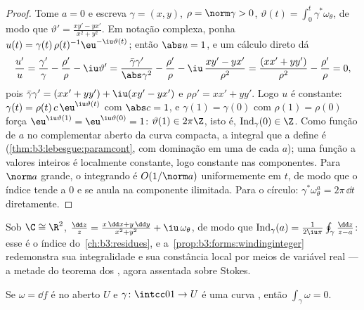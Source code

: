 \begin{proof}
Tome $a = 0$ e escreva $\gamma = (x, y)$, $\rho =
\norm\gamma > 0$, $\vartheta(t) =
\int_0^t\gamma^*\omega_\theta$, de modo que $\vartheta' =
\frac{xy' - yx'}{x^2 + y^2}$. Em
notação complexa, ponha $u(t)
= \gamma(t)\,\rho(t)^{-1}\eu^{-\iu\vartheta(t)}$; então $\abs u = 1$, e um cálculo direto dá
\[
\frac{u'}{u} = \frac{\gamma'}{\gamma} - \frac{\rho'}{\rho}
- \iu\vartheta'
= \frac{\bar\gamma\gamma'}{\abs\gamma^2} -
\frac{\rho'}{\rho} - \iu\,\frac{xy' -
yx'}{\rho^2}
= \frac{(xx' + yy')}{\rho^2} - \frac{\rho'}{\rho} = 0,
\]
pois $\bar\gamma\gamma' = (xx' + yy') + \iu(xy' - yx')$ e $\rho\rho' = xx' + yy'$. Logo $u$ é constante: $\gamma(t) =
\rho(t)\,c\,\eu^{\iu\vartheta(t)}$ com $\abs c = 1$, e $\gamma(1) = \gamma(0)$
com $\rho(1) = \rho(0)$ força $\eu^{\iu\vartheta(1)} = \eu^{\iu\vartheta(0)} = 1$: $\vartheta(1) \in 2\pi\Z$, isto é, $\operatorname{Ind}_\gamma(0) \in \Z$. Como função de $a$ no
complementar aberto da curva compacta, a integral que a define é
 (\cref{thm:b3:lebesgue:paramcont}, com dominação em uma  de cada
$a$); uma função  a valores inteiros é localmente constante,
logo constante nas componentes. Para $\norm a$ grande, o integrando é $O(1/\norm a)$
uniformemente em $t$, de modo que o índice tende a $0$ e se anula
na componente ilimitada. Para o círculo: $\gamma^*\omega_\theta^a = 2\pi\,\dd t$ diretamente.
\end{proof}

\begin{remark}
Sob $\C \cong \R^2$, $\frac{\dd z}{z} = \frac{x\,\dd x +
y\,\dd y}{x^2 + y^2} + \iu\,\omega_\theta$, de modo que $\operatorname{Ind}_\gamma(a) =
\frac1{2\iu\pi}\oint_\gamma\frac{\dd z}{z - a}$: esse é o índice do~\cref{ch:b3:residues},
e a~\cref{prop:b3:forms:windinginteger} redemonstra sua integralidade e sua constância local
por meios de variável real --- a metade  do teorema dos
, agora assentada sobre Stokes.
\end{remark}

\begin{proposition}\label{prop:b3:forms:exactloop}
Se $\omega = \dd f$ é  no aberto $U$ e $\gamma\colon\intcc01\to U$ é uma curva , então
$\int_\gamma\omega = 0$.
\end{proposition}

